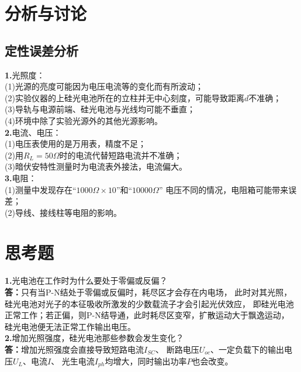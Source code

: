 \documentclass{article}
\def\kong{\hspace*{2em}}
\begin{document}
\section{分析与讨论}
    \subsection{定性误差分析}
    \kong \textbf{1.}光照度：\\
    \kong \kong (1)光源的亮度可能因为电压电流等的变化而有所波动；\\
    \kong \kong (2)实验仪器的上硅光电池所在的立柱并无中心刻度，可能导致距离$d$不准确；\\
    \kong \kong (3)导轨与电源前端、硅光电池与光线均可能不垂直；\\
    \kong \kong (4)环境中除了实验光源外的其他光源影响。\\
    \kong \textbf{2.}电流、电压：\\
    \kong \kong (1)电压表使用的是万用表，精度不足；\\
    \kong \kong (2)用$R_L=50\Omega$时的电流代替短路电流并不准确；\\
    \kong \kong (3)暗伏安特性测量时为电流表外接法，电流偏大。\\
    \kong \textbf{3.}电阻：\\
    \kong \kong (1)测量中发现存在“$1000\Omega \times10$”和“$10000\Omega$”
    电压不同的情况，电阻箱可能带来误差；\\
    \kong \kong (2)导线、接线柱等电阻的影响。
\section{思考题}
    \kong \textbf{1.}光电池在工作时为什么要处于零偏或反偏？\\
    \kong \textbf{答：}只有当P-N结处于零偏或反偏时，耗尽区才会存在内电场，
    此时对其光照，硅光电池对光子的本征吸收所激发的少数载流子才会引起光伏效应，
    即硅光电池正常工作；若正偏，则P-N结导通，此时耗尽区变窄，扩散运动大于飘逸运动，
    硅光电池便无法正常工作输出电压。\\
    \kong \textbf{2.}增加光照强度，硅光电池那些参数会发生变化？\\
    \kong \textbf{答：}增加光照强度会直接导致短路电流$I_{SC}$、
    断路电压$U_{oc}$、一定负载下的输出电压$U_L$、电流$I$、
    光生电流$I_{ph}$均增大，同时输出功率$P$也会改变。\\
\end{document}
